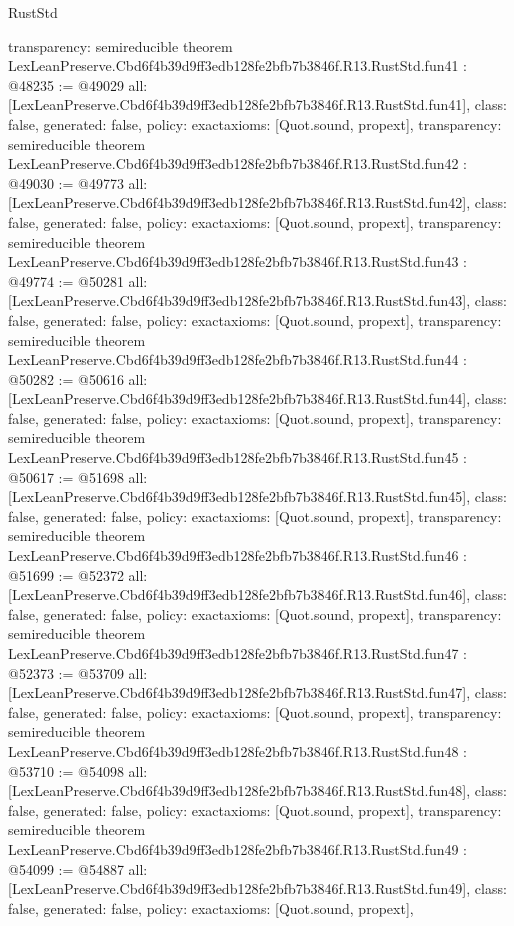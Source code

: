 \begin{lexlean}{RustStd}
\begin{coremodule}
{  transparency: semireducible
}
theorem LexLeanPreserve.Cbd6f4b39d9ff3edb128fe2bfb7b3846f.R13.RustStd.fun41 : @48235 := @49029 {
  all: [LexLeanPreserve.Cbd6f4b39d9ff3edb128fe2bfb7b3846f.R13.RustStd.fun41],
  class: false,
  generated: false,
  policy: exact{axioms: [Quot.sound, propext]},
  transparency: semireducible
}
theorem LexLeanPreserve.Cbd6f4b39d9ff3edb128fe2bfb7b3846f.R13.RustStd.fun42 : @49030 := @49773 {
  all: [LexLeanPreserve.Cbd6f4b39d9ff3edb128fe2bfb7b3846f.R13.RustStd.fun42],
  class: false,
  generated: false,
  policy: exact{axioms: [Quot.sound, propext]},
  transparency: semireducible
}
theorem LexLeanPreserve.Cbd6f4b39d9ff3edb128fe2bfb7b3846f.R13.RustStd.fun43 : @49774 := @50281 {
  all: [LexLeanPreserve.Cbd6f4b39d9ff3edb128fe2bfb7b3846f.R13.RustStd.fun43],
  class: false,
  generated: false,
  policy: exact{axioms: [Quot.sound, propext]},
  transparency: semireducible
}
theorem LexLeanPreserve.Cbd6f4b39d9ff3edb128fe2bfb7b3846f.R13.RustStd.fun44 : @50282 := @50616 {
  all: [LexLeanPreserve.Cbd6f4b39d9ff3edb128fe2bfb7b3846f.R13.RustStd.fun44],
  class: false,
  generated: false,
  policy: exact{axioms: [Quot.sound, propext]},
  transparency: semireducible
}
theorem LexLeanPreserve.Cbd6f4b39d9ff3edb128fe2bfb7b3846f.R13.RustStd.fun45 : @50617 := @51698 {
  all: [LexLeanPreserve.Cbd6f4b39d9ff3edb128fe2bfb7b3846f.R13.RustStd.fun45],
  class: false,
  generated: false,
  policy: exact{axioms: [Quot.sound, propext]},
  transparency: semireducible
}
theorem LexLeanPreserve.Cbd6f4b39d9ff3edb128fe2bfb7b3846f.R13.RustStd.fun46 : @51699 := @52372 {
  all: [LexLeanPreserve.Cbd6f4b39d9ff3edb128fe2bfb7b3846f.R13.RustStd.fun46],
  class: false,
  generated: false,
  policy: exact{axioms: [Quot.sound, propext]},
  transparency: semireducible
}
theorem LexLeanPreserve.Cbd6f4b39d9ff3edb128fe2bfb7b3846f.R13.RustStd.fun47 : @52373 := @53709 {
  all: [LexLeanPreserve.Cbd6f4b39d9ff3edb128fe2bfb7b3846f.R13.RustStd.fun47],
  class: false,
  generated: false,
  policy: exact{axioms: [Quot.sound, propext]},
  transparency: semireducible
}
theorem LexLeanPreserve.Cbd6f4b39d9ff3edb128fe2bfb7b3846f.R13.RustStd.fun48 : @53710 := @54098 {
  all: [LexLeanPreserve.Cbd6f4b39d9ff3edb128fe2bfb7b3846f.R13.RustStd.fun48],
  class: false,
  generated: false,
  policy: exact{axioms: [Quot.sound, propext]},
  transparency: semireducible
}
theorem LexLeanPreserve.Cbd6f4b39d9ff3edb128fe2bfb7b3846f.R13.RustStd.fun49 : @54099 := @54887 {
  all: [LexLeanPreserve.Cbd6f4b39d9ff3edb128fe2bfb7b3846f.R13.RustStd.fun49],
  class: false,
  generated: false,
  policy: exact{axioms: [Quot.sound, propext]},
}
\end{coremodule}
\end{lexlean}
